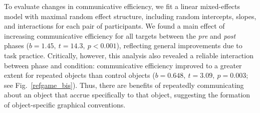\documentclass[10pt,letterpaper]{article}
\newcommand{\ndg}[1]{{\textcolor{Green}{[ndg: #1]}}}
\begin{document}
To evaluate changes in communicative efficiency, we fit a linear mixed-effects model with maximal random effect structure, including random intercepts, slopes, and interactions for each pair of participants.
We found a main effect of increasing communicative efficiency for all targets between the \textit{pre} and \textit{post} phases ($b = 1.45,~t = 14.3,~p <0.001$), reflecting general improvements due to task practice.
Critically, however, this analysis also revealed a reliable interaction between phase and condition: communicative efficiency improved to a greater extent for repeated objects than control objects ($b = 0.648, ~t = 3.09,~p = 0.003$; see Fig.~\ref{refgame_bis}).
Thus, there are benefits of repeatedly communicating about an object that accrue specifically to that object, suggesting the formation of object-specific graphical conventions.







\end{document}
